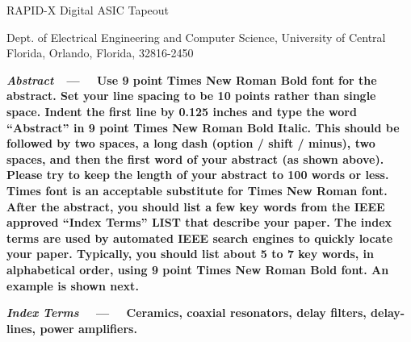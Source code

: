 \documentclass[10pt]{article}
\begin{document}
\linespread{1.0} %

\begin{multicols}{2}

\begin{center}
    {\fontsize{18pt}{22pt}\selectfont RAPID-X Digital ASIC Tapeout\par}

    \vspace{1em}
    

    \vspace{1em}
    
    {\selectfont Dept. of Electrical Engineering and Computer Science, University of Central Florida, Orlando, Florida, 32816-2450\par}
    
\end{center}

\vspace{1em}

{\fontsize{9pt}{10pt}\selectfont
\setlength{\parindent}{0.125in}
\textbf{\textit{Abstract}\ \ --- \ \ Use 9 point Times New Roman Bold font for the abstract. Set your line spacing to be 10 points rather than single space. Indent the first line by 0.125 inches and type the word “Abstract” in 9 point Times New Roman Bold Italic. This should be followed by two spaces, a long dash (option / shift / minus), two spaces, and then the first word of your abstract (as shown above). Please try to keep the length of your abstract to 100 words or less. Times font is an acceptable substitute for Times New Roman font. After the abstract, you should list a few key words from the IEEE approved “Index Terms” LIST that describe your paper. The index terms are used by automated IEEE search engines to quickly locate your paper. Typically, you should list about 5 to 7 key words, in alphabetical order, using 9 point Times New Roman Bold font. An example is shown next.}

\vspace{0pt}

\textbf{ \textit{Index Terms} \ \ --- \ \ Ceramics, coaxial resonators, delay filters, delay-lines, power amplifiers. }

}
\end{multicols}
\end{document}
